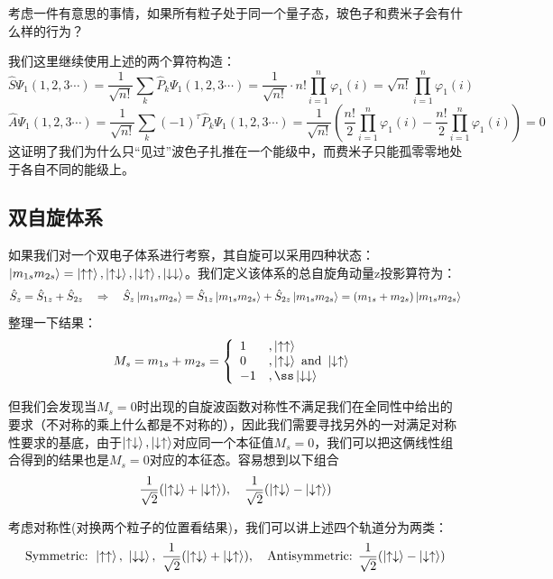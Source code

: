 考虑一件有意思的事情，如果所有粒子处于同一个量子态，玻色子和费米子会有什么样的行为？

我们这里继续使用上述的两个算符构造：
\[\hat{S}\varPsi_{1}(1,2,3 \cdots)=\frac{1}{\sqrt{n!}}\sum_{k}\hat{P}_{k}\varPsi_{1}(1,2,3 \cdots)=\frac{1}{\sqrt{n!}}\cdot n!\prod_{i=1}^n\varphi_1(i)=\sqrt{n!}\prod_{i=1}^n\varphi_1(i)\]
\[\hat{A}\varPsi_{1}(1,2,3 \cdots)=\frac{1}{\sqrt{n!}}\sum_{k}(-1)^{\tau}\hat{P}_{k}\varPsi_{1}(1,2,3 \cdots)=\frac{1}{\sqrt{n!}}\left (\frac{n!}{2}\prod_{i=1}^n\varphi_1(i)-\frac{n!}{2}\prod_{i=1}^n\varphi_1(i) \right )=0\]
这证明了我们为什么只“见过”波色子扎推在一个能级中，而费米子只能孤零零地处于各自不同的能级上。

\subsection{双自旋体系}\label{sec:double_spin}
如果我们对一个双电子体系进行考察，其自旋可以采用四种状态：$\ket{m_{1s}m_{2s}}=\ket{\uparrow\uparrow},\ket{\uparrow\downarrow},\ket{\downarrow\uparrow},\ket{\downarrow\downarrow}$。我们定义该体系的总自旋角动量z投影算符为：
\[\hat{S}_z=\hat{S}_{1z}+\hat{S}_{2z} \quad \Rightarrow \quad \hat{S}_z\ket{m_{1s}m_{2s}}=\hat{S}_{1z}\ket{m_{1s}m_{2s}}+\hat{S}_{2z}\ket{m_{1s}m_{2s}}=(m_{1s}+m_{2s})\ket{m_{1s}m_{2s}}\]
整理一下结果：
\[M_s=m_{1s}+m_{2s}=\left\{
\begin{array}{ll}
1  & ,\ket{\uparrow\uparrow}\\
0  & ,\ket{\uparrow\downarrow}\text{ and }\ket{\downarrow\uparrow}\\
-1 & ,ß\ket{\downarrow\downarrow}
\end{array}
\right.\]

但我们会发现当$M_s=0$时出现的自旋波函数对称性不满足我们在全同性中给出的要求（不对称的乘上什么都是不对称的），因此我们需要寻找另外的一对满足对称性要求的基底，由于$\ket{\uparrow\downarrow},\ket{\downarrow\uparrow}$对应同一个本征值$M_s=0$，我们可以把这俩线性组合得到的结果也是$M_s=0$对应的本征态。容易想到以下组合
\[\frac{1}{\sqrt{2}}(\ket{\uparrow\downarrow}+\ket{\downarrow\uparrow}), \quad \frac{1}{\sqrt{2}}(\ket{\uparrow\downarrow}-\ket{\downarrow\uparrow})\]

考虑对称性(对换两个粒子的位置看结果)，我们可以讲上述四个轨道分为两类：
\[\text{Symmetric: }\ket{\uparrow\uparrow}, \ \ket{\downarrow\downarrow}, \ \frac{1}{\sqrt{2}}(\ket{\uparrow\downarrow}+\ket{\downarrow\uparrow}), \quad \text{Antisymmetric: }\frac{1}{\sqrt{2}}(\ket{\uparrow\downarrow}-\ket{\downarrow\uparrow})\]

